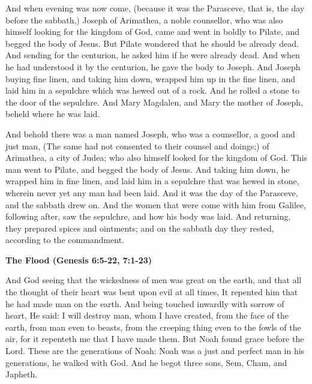 And when evening was now come, (because it was the Parasceve, that is, the day before the sabbath,) Joseph of Arimathea, a noble counsellor, who was also himself looking for the kingdom of God, came and went in boldly to Pilate, and begged the body of Jesus. But Pilate wondered that he should be already dead. And sending for the centurion, he asked him if he were already dead. And when he had understood it by the centurion, he gave the body to Joseph. And Joseph buying fine linen, and taking him down, wrapped him up in the fine linen, and laid him in a sepulchre which was hewed out of a rock. And he rolled a stone to the door of the sepulchre. And Mary Magdalen, and Mary the mother of Joseph, beheld where he was laid.

And behold there was a man named Joseph, who was a counsellor, a good and just man, (The same had not consented to their counsel and doings;) of Arimathea, a city of Judea; who also himself looked for the kingdom of God. This man went to Pilate, and begged the body of Jesus. And taking him down, he wrapped him in fine linen, and laid him in a sepulchre that was hewed in stone, wherein never yet any man had been laid. And it was the day of the Parasceve, and the sabbath drew on. And the women that were come with him from Galilee, following after, saw the sepulchre, and how his body was laid. And returning, they prepared spices and ointments; and on the sabbath day they rested, according to the commandment.

\textbf{The Flood (Genesis 6:5-22, 7:1-23)}

And God seeing that the wickedness of men was great on the earth, and that all the thought of their heart was bent upon evil at all times, It repented him that he had made man on the earth. And being touched inwardly with sorrow of heart, He said: I will destroy man, whom I have created, from the face of the earth, from man even to beasts, from the creeping thing even to the fowls of the air, for it repenteth me that I have made them. But Noah found grace before the Lord. These are the generations of Noah: Noah was a just and perfect man in his generations, he walked with God. And he begot three sons, Sem, Cham, and Japheth.

